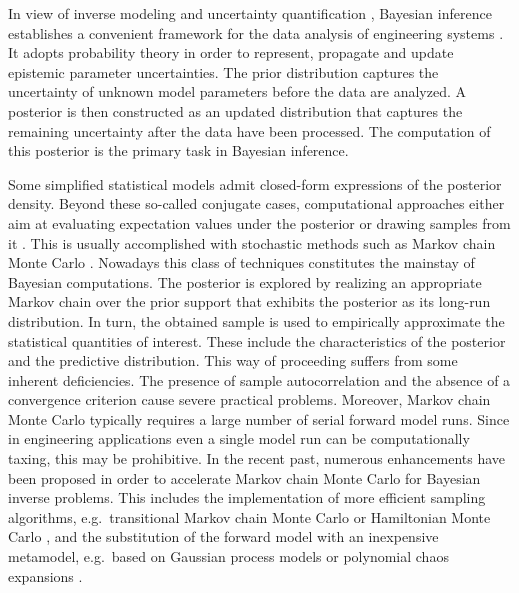In view of inverse modeling \cite{Inversion:Tarantola2005,Inversion:Kaipio2005} and uncertainty quantification \cite{Uncertainty:Smith2014,Uncertainty:Sullivan2015},
Bayesian inference establishes a convenient framework for the data analysis of engineering systems \cite{Bayesian:Hadidi2008,Bayesian:Beck2010,Bayesian:Yuen2011}.
It adopts probability theory in order to represent, propagate and update epistemic parameter uncertainties.
The prior distribution captures the uncertainty of unknown model parameters before the data are analyzed.
A posterior is then constructed as an updated distribution that captures the remaining uncertainty after the data have been processed.
The computation of this posterior is the primary task in Bayesian inference.
\par %
Some simplified statistical models admit closed-form expressions of the posterior density.
Beyond these so-called conjugate cases,
computational approaches either aim at evaluating expectation values under the posterior or drawing samples from it \cite{Bayesian:Evans1995}.
This is usually accomplished with stochastic methods such as Markov chain Monte Carlo \cite{MCMC:Gilks1996,MCMC:Brooks2011}.
Nowadays this class of techniques constitutes the mainstay of Bayesian computations.
The posterior is explored by realizing an appropriate Markov chain over the prior support that exhibits the posterior as its long-run distribution.
In turn, the obtained sample is used to empirically approximate the statistical quantities of interest.
These include the characteristics of the posterior and the predictive distribution.
This way of proceeding suffers from some inherent deficiencies.
The presence of sample autocorrelation and the absence of a convergence criterion cause severe practical problems.
Moreover, Markov chain Monte Carlo typically requires a large number of serial forward model runs.
Since in engineering applications even a single model run can be computationally taxing, this may be prohibitive.
In the recent past, numerous enhancements have been proposed in order to accelerate Markov chain Monte Carlo for Bayesian inverse problems.
This includes the implementation of more efficient sampling algorithms,
e.g.\ transitional Markov chain Monte Carlo \cite{MCMC:Beck2002,MCMC:Ching2007} or Hamiltonian Monte Carlo \cite{MCMC:Cheung2009,MCMC:Boulkaibet2015,Nagel:JRUES2016},
and the substitution of the forward model with an inexpensive metamodel,
e.g.\ based on Gaussian process models \cite{Kriging:Higdon2004,Kriging:Higdon2015} or polynomial chaos expansions \cite{PCE:Marzouk2007,PCE:Marzouk2009:a,PCE:Marzouk2009:b}.
